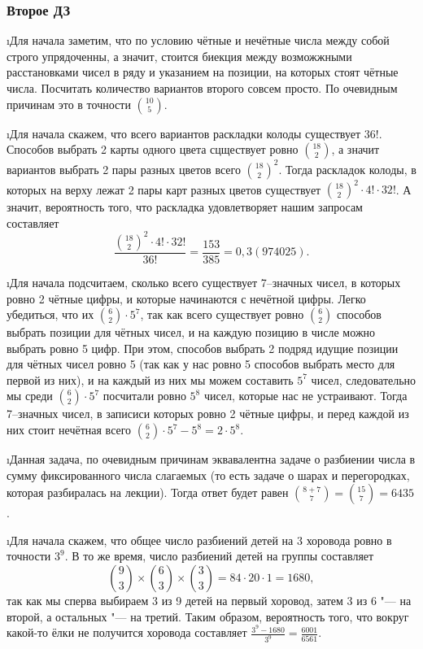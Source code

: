 \subsubsection{Второе ДЗ}

\i Для начала заметим, что по условию чётные и нечётные числа между собой строго упрядоченны, а значит, стоится биекция между возможжными расстановками чисел в ряду и указанием на позиции, на которых стоят чётные числа. Посчитать количество вариантов второго совсем просто. По очевидным причинам это в точности $\binom{10}{5}$.

\i Для начала скажем, что всего вариантов раскладки колоды существует $36!$. Способов выбрать 2 карты одного цвета сцществует ровно $\binom{18}{2}$, а значит вариантов выбрать 2 пары разных цветов всего $\binom{18}{2}^2$. Тогда раскладок колоды, в которых на верху лежат 2 пары карт разных цветов существует $\binom{18}{2}^2 \cdot 4! \cdot 32!$. А значит, вероятность того, что раскладка удовлетворяет нашим запросам составляет
$$\frac{\binom{18}{2}^2 \cdot 4! \cdot 32!}{36!} = \frac{153}{385} = 0{,}3(974025).$$

\i Для начала подсчитаем, сколько всего существует 7--значных чисел, в которых ровно 2 чётные цифры, и которые начинаются с нечётной цифры. Легко убедиться, что их $\binom{6}{2} \cdot 5^7$, так как всего существует ровно $\binom{6}{2}$ способов выбрать позиции для чётных чисел, и на каждую позицию в числе можно выбрать ровно 5 цифр. При этом, способов выбрать 2 подряд идущие позиции для чётных чисел ровно 5 (так как у нас ровно 5 способов выбрать место для первой из них), и на каждый из них мы можем составить $5^7$ чисел, следовательно мы среди $\binom{6}{2} \cdot 5^7$ посчитали ровно $5^8$ чисел, которые нас не устраивают. Тогда 7--значных чисел, в записиси которых ровно 2 чётные цифры, и перед каждой из них стоит нечётная всего $\binom{6}{2} \cdot 5^7 - 5^8 = 2 \cdot 5^8.$

\i Данная задача, по очевидным причинам эквавалентна задаче о разбиении числа в сумму фиксированного числа слагаемых (то есть задаче о шарах и перегородках, которая разбиралась на лекции). Тогда ответ будет равен $\binom{8+7}{7} = \binom{15}{7} = 6435$.

\i Для начала скажем, что общее число разбиений детей на 3 хоровода ровно в точности $3^9$. В то же время, число разбиений детей на группы составляет 
$$\binom{9}{3} \times \binom{6}{3} \times \binom{3}{3} = 84 \cdot 20 \cdot 1 = 1680,$$
так как мы сперва выбираем 3 из 9 детей на первый хоровод, затем 3 из 6 "--- на второй, а остальных "--- на третий. Таким образом, вероятность того, что вокруг какой-то ёлки не получится хоровода составляет $\frac{3^9 - 1680}{3^9} = \frac{6001}{6561}.$

